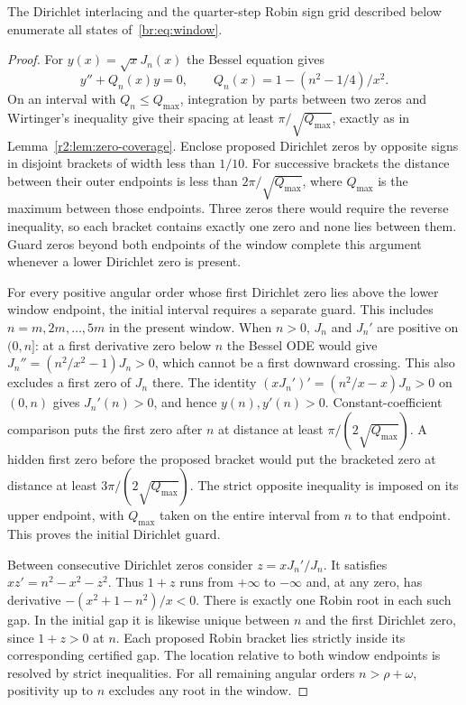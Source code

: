 \begin{lemma}\label{br:lem:coverage}
The Dirichlet interlacing and the quarter-step Robin sign grid described
below enumerate all states of~\eqref{br:eq:window}.
\end{lemma}
\begin{proof}
For $y(x)=\sqrt xJ_n(x)$ the Bessel equation gives
\[
 y''+Q_n(x)y=0,\qquad Q_n(x)=1-(n^2-1/4)/x^2.
\]
On an interval with $Q_n\le Q_{\max}$, integration by parts between two
zeros and Wirtinger's inequality give their spacing at least
$\pi/\sqrt{Q_{\max}}$, exactly as in
Lemma~\ref{r2:lem:zero-coverage}. Enclose proposed Dirichlet zeros by
opposite signs in disjoint brackets of width less than $1/10$.
For successive brackets the distance between their outer endpoints is
less than $2\pi/\sqrt{Q_{\max}}$, where $Q_{\max}$ is the maximum
between those endpoints. Three zeros there would require the reverse
inequality, so each bracket contains exactly one zero and none lies
between them. Guard zeros beyond both endpoints of the window
complete this argument whenever a lower Dirichlet zero is present.

For every positive angular order whose first Dirichlet zero lies above
the lower window endpoint, the initial interval requires a separate guard.
This includes $n=m,2m,\ldots,5m$ in the present window. When $n>0$, $J_n$ and $J_n'$ are
positive on $(0,n]$: at a first derivative zero below $n$ the Bessel ODE
would give $J_n''=(n^2/x^2-1)J_n>0$, which cannot be a first downward
crossing. This also excludes a first zero of $J_n$ there. The identity
$(xJ_n')'=(n^2/x-x)J_n>0$ on $(0,n)$ gives $J_n'(n)>0$,
and hence $y(n),y'(n)>0$. Constant-coefficient comparison puts the
first zero after $n$ at distance at least $\pi/(2\sqrt{Q_{\max}})$.
A hidden first zero before the proposed bracket would put the bracketed
zero at distance at least $3\pi/(2\sqrt{Q_{\max}})$. The strict opposite
inequality is imposed on its upper endpoint, with $Q_{\max}$ taken on
the entire interval from $n$ to that endpoint. This proves the initial
Dirichlet guard.

Between consecutive Dirichlet zeros consider $z=xJ_n'/J_n$. It satisfies
$xz'=n^2-x^2-z^2$. Thus $1+z$ runs from $+\infty$ to $-\infty$ and, at any
zero, has derivative $-(x^2+1-n^2)/x<0$. There is exactly one Robin root
in each such gap. In the initial gap it is likewise unique between $n$
and the first Dirichlet zero, since $1+z>0$ at $n$. Each proposed Robin
bracket lies strictly inside its corresponding certified gap. The
location relative to both window endpoints is resolved by strict
inequalities. For all remaining angular orders $n>\rho+\omega$,
positivity up to $n$ excludes any root in the window.


\end{proof}
